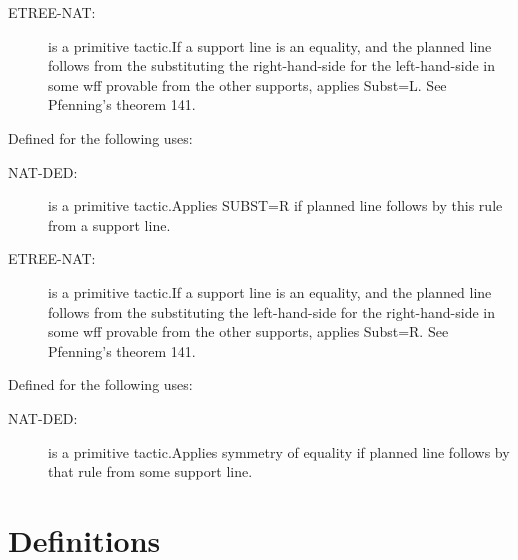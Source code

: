 \begin{description}
\begin{description}
\item[ETREE-NAT:]  is a primitive tactic.If a support line is an equality, and the planned line follows from the
substituting the right-hand-side for the left-hand-side in some wff provable
from the other supports, applies Subst=L.  See Pfenning's theorem 141.

\end{description}

\item[SUBST=R-TAC]  Defined for the following uses:
\begin{description}
\item[NAT-DED:]  is a primitive tactic.Applies SUBST=R if planned line follows by this rule from a support line.

\item[ETREE-NAT:]  is a primitive tactic.If a support line is an equality, and the planned line follows from the
substituting the left-hand-side for the right-hand-side in some wff provable
from the other supports, applies Subst=R.  See Pfenning's theorem 141.

\end{description}

\item[SYM=-TAC]  Defined for the following uses:
\begin{description}
\item[NAT-DED:]  is a primitive tactic.Applies symmetry of equality if planned line follows by that rule from
some support line.

\end{description}

\item
\end{description}

\section{Definitions}

